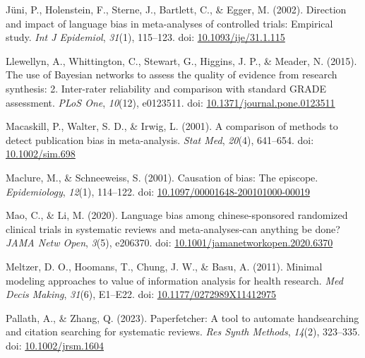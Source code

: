 \documentclass[
  letterpaper,
  DIV=11,
  numbers=noendperiod]{scrreprt}
\newlength{\cslhangindent}
\newlength{\cslentryspacingunit} %
\newenvironment{CSLReferences}[2] %
 {%
  \setlength{\parindent}{0pt}
  \ifodd #1
  \let\oldpar\par
  \def\par{\hangindent=\cslhangindent\oldpar}
  \fi
  \setlength{\parskip}{#2\cslentryspacingunit}
 }%
 {}
\begin{document}
\begin{CSLReferences}{1}{0}
\leavevmode{}%
Jüni, P., Holenstein, F., Sterne, J., Bartlett, C., \& Egger, M. (2002).
Direction and impact of language bias in meta-analyses of controlled
trials: Empirical study. \emph{Int J Epidemiol}, \emph{31}(1), 115--123.
doi: \href{https://doi.org/10.1093/ije/31.1.115}{10.1093/ije/31.1.115}

\leavevmode{}%
Llewellyn, A., Whittington, C., Stewart, G., Higgins, J. P., \& Meader,
N. (2015). The use of {Bayesian} networks to assess the quality of
evidence from research synthesis: 2. {I}nter-rater reliability and
comparison with standard {GRADE} assessment. \emph{PLoS One},
\emph{10}(12), e0123511. doi:
\href{https://doi.org/10.1371/journal.pone.0123511}{10.1371/journal.pone.0123511}

\leavevmode{}%
Macaskill, P., Walter, S. D., \& Irwig, L. (2001). A comparison of
methods to detect publication bias in meta-analysis. \emph{Stat Med},
\emph{20}(4), 641--654. doi:
\href{https://doi.org/10.1002/sim.698}{10.1002/sim.698}

\leavevmode{}%
Maclure, M., \& Schneeweiss, S. (2001). Causation of bias: The episcope.
\emph{Epidemiology}, \emph{12}(1), 114--122. doi:
\href{https://doi.org/10.1097/00001648-200101000-00019}{10.1097/00001648-200101000-00019}

\leavevmode{}%
Mao, C., \& Li, M. (2020). Language bias among chinese-sponsored
randomized clinical trials in systematic reviews and meta-analyses-can
anything be done? \emph{JAMA Netw Open}, \emph{3}(5), e206370. doi:
\href{https://doi.org/10.1001/jamanetworkopen.2020.6370}{10.1001/jamanetworkopen.2020.6370}

\leavevmode{}%
Meltzer, D. O., Hoomans, T., Chung, J. W., \& Basu, A. (2011). Minimal
modeling approaches to value of information analysis for health
research. \emph{Med Decis Making}, \emph{31}(6), E1--E22. doi:
\href{https://doi.org/10.1177/0272989X11412975}{10.1177/0272989X11412975}

\leavevmode{}%
Pallath, A., \& Zhang, Q. (2023). Paperfetcher: A tool to automate
handsearching and citation searching for systematic reviews. \emph{Res
Synth Methods}, \emph{14}(2), 323--335. doi:
\href{https://doi.org/10.1002/jrsm.1604}{10.1002/jrsm.1604}


\end{CSLReferences}
\end{document}
